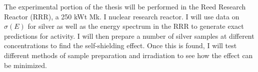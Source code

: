 \documentclass{article}
\begin{document}
The experimental portion of the thesis will be performed in the Reed Research Reactor (RRR), a 250 kWt  Mk. I nuclear research reactor. I will use data on $\sigma(E)$ for silver as well as the energy spectrum in the RRR to generate exact predictions for activity. I will then prepare a number of silver samples at different concentrations to find the self-shielding effect. Once this is found, I will test different methods of sample preparation and irradiation to see how the effect can be minimized.



\end{document}
